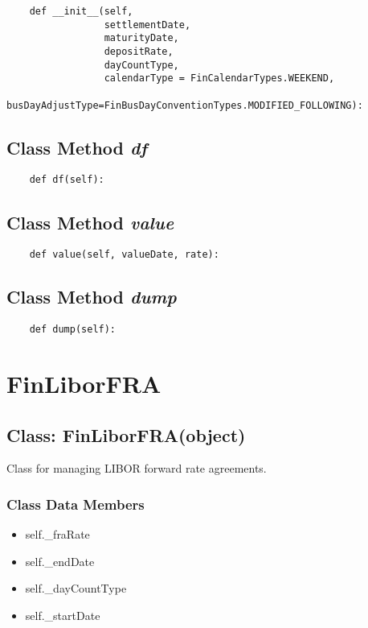 \documentclass[twoside,11pt]{book}
\begin{document}
\begin{lstlisting}
    def __init__(self, 
                 settlementDate, 
                 maturityDate, 
                 depositRate, 
                 dayCountType, 
                 calendarType = FinCalendarTypes.WEEKEND,
                 busDayAdjustType=FinBusDayConventionTypes.MODIFIED_FOLLOWING):
\end{lstlisting}

\subsection{Class Method {\it df}}


\begin{lstlisting}
    def df(self):
\end{lstlisting}

\subsection{Class Method {\it value}}


\begin{lstlisting}
    def value(self, valueDate, rate):
\end{lstlisting}

\subsection{Class Method {\it dump}}


\begin{lstlisting}
    def dump(self):
\end{lstlisting}

\newpage
\section{FinLiborFRA}

\subsection{Class: FinLiborFRA(object)}
Class for managing LIBOR forward rate agreements. 

\subsubsection{Class Data Members}
\begin{itemize}
\item{self.\_fraRate}
\item{self.\_endDate}
\item{self.\_dayCountType}
\item{self.\_startDate}
\end{itemize}
\end{document}
